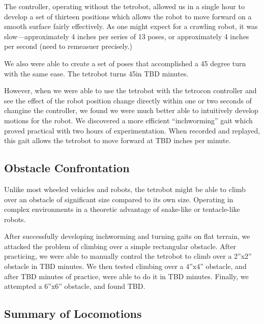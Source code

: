 \documentclass[conference]{IEEEtran}
\begin{document}
 The controller, operating without the tetrobot,
 allowed us in a single hour to develop a set
 of thirteen positions which allows the robot to move forward
 on a smooth surface fairly effectively. As one might expect
 for a crawling robot, it was slow---approximately 4 inches
 per series of 13 poses, or approximately 4 inches per second
 (need to remeasuer precisely.)

 We also were able to create a set of poses that accomplished
 a 45 degree turn with the same ease. The tetrobot turns 45\degree in
 TBD minutes.

 However, when we were able to use the tetrobot with the tetrocon
 controller and see the effect of the robot position change directly
 within one or two seconds of changine the controller, we found we
 were much better able to intuitively develop motions for the robot.
 We discovered a more efficient ``inchworming'' gait which proved
 practical with two hours of experimentation. When recorded and
 replayed, this gait allows the tetrobot to move forward at TBD
 inches per minute.

 \subsection{Obstacle Confrontation}

 Unlike most wheeled vehicles and robots, the tetrobot might be able
 to climb over an obstacle of significant size compared to
 its own size. Operating in complex environments in a theoretic
 advantage of snake-like or tentacle-like robots.

 After successfully developing inchworming and turning gaits on
 flat terrain, we attacked the problem of climbing over a simple rectangular
 obstacle.  After practicing, we were able to manually control the
 tetrobot to climb over a 2''x2'' obstacle in TBD minutes. We then
 tested climbing over a 4''x4'' obstacle, and after TBD minutes of practice,
 were able to do it in TBD minutes. Finally, we attempted a 6''x6'' obstacle,
 and found TBD.

 \subsection{Summary of Locomotions}
\end{document}
